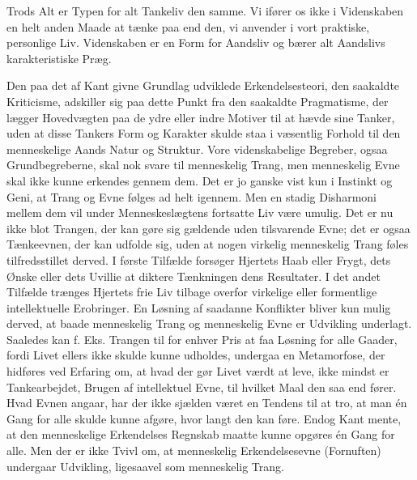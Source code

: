 \documentclass[12pt]{article}
\newcommand{\opage}[1]{\marginnote{\footnotesize\textit{[#1]}}}
\begin{document}
Trods Alt er Typen for alt Tankeliv den samme. Vi ifører os ikke i
Videnskaben en helt anden Maade at tænke paa end den, vi anvender i
vort praktiske, personlige Liv. Videnskaben er en Form for Aandsliv og
bærer alt Aandslivs karakteristiske Præg.

Den paa det af Kant givne Grundlag udviklede Erkendelsesteori, den
saakaldte Kriticisme, adskiller sig paa dette Punkt fra den saakaldte
Pragmatisme, der lægger Hovedvægten paa de ydre eller indre Motiver til
at hævde sine Tanker, uden at disse Tankers Form og Karakter skulde
staa i væsentlig Forhold til den menneskelige Aands Natur og Struktur.
Vore videnskabelige Begreber, ogsaa Grundbegreberne, skal nok svare
til menneskelig Trang, men menneskelig Evne skal ikke kunne erkendes
gennem dem. Det er jo ganske vist kun i Instinkt og Geni, at Trang og
Evne følges ad helt igennem. Men en stadig Disharmoni mellem dem vil
under Menneskeslægtens fortsatte Liv være umulig. Det er nu ikke blot
Trangen, der kan gøre sig gældende uden tilsvarende Evne; det er ogsaa
Tænkeevnen, der kan udfolde sig, uden at nogen virkelig menneskelig
Trang føles tilfredsstillet derved. I første Tilfælde forsøger Hjertets
Haab eller Frygt, dets Ønske eller dets Uvillie at diktere Tænkningen
dens Resultater. I det andet Tilfælde trænges Hjertets frie Liv tilbage
overfor virkelige eller formentlige intellektuelle Erobringer. En
Løsning af saadanne Konflikter bliver kun mulig derved, at baade
menneskelig Trang og menneskelig Evne er Udvikling underlagt. Saaledes
kan f. Eks.
\setcounter{footnote}{0}%
\opage{13}Trangen til for enhver Pris at faa Løsning for alle Gaader,
fordi Livet ellers ikke skulde kunne udholdes, undergaa en Metamorfose,
der hidføres ved Erfaring om, at hvad der gør Livet værdt at leve,
ikke mindst er Tankearbejdet, Brugen af intellektuel Evne, til hvilket
Maal den saa end fører. Hvad Evnen angaar, har der ikke sjælden været
en Tendens til at tro, at man én Gang for alle skulde kunne afgøre,
hvor langt den kan føre. Endog Kant mente, at den menneskelige
Erkendelses Regnskab maatte kunne opgøres én Gang for alle. Men der er
ikke Tvivl om, at menneskelig Erkendelsesevne (\guillemotright{}Fornuften\guillemotleft{}) undergaar
Udvikling, ligesaavel som menneskelig Trang.
\end{document}
